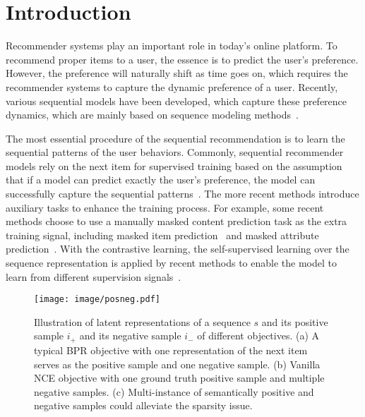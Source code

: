\documentclass[conference]{IEEEtran}
\begin{document}
\section{Introduction}
\label{sec:intro}
Recommender systems play an important role in today's online platform. To recommend proper items to a user, the essence is to predict the user's preference. However, the preference will naturally shift as time goes on, which requires the recommender systems to capture the dynamic preference of a user. Recently, various sequential models have been developed, which capture these preference dynamics, which are mainly based on sequence modeling methods~\cite{gru4rec,caser,sasrec,fdsa,bert4rec,s3rec,s2s,gru4recf,safm,fgnn,fgnnj,gag,posrec}. 

The most essential procedure of the sequential recommendation is to learn the sequential patterns of the user behaviors. Commonly, sequential recommender models rely on the next item for supervised training based on the assumption that if a model can predict exactly the user's preference, the model can successfully capture the sequential patterns~\cite{gru4rec,caser,sasrec}. The more recent methods introduce auxiliary tasks to enhance the training process. For example, some recent methods choose to use a manually masked content prediction task as the extra training signal, including masked item prediction~\cite{bert4rec} and masked attribute prediction~\cite{s3rec}. With the contrastive learning, the self-supervised learning over the sequence representation is applied by recent methods to enable the model to learn from different supervision signals~\cite{s3rec,s2s,xie2020contrastive,zhou2020contrastive}.

\begin{figure}
    \centering
    \texttt{[image: image/posneg.pdf]}
    \caption{Illustration of latent representations of a sequence $s$ and its positive sample $i_+$ and its negative sample $i_-$ of different objectives. (a) A typical BPR objective with one representation of the next item serves as the positive sample and one negative sample. (b) Vanilla NCE objective with one ground truth positive sample and multiple negative samples. (c) Multi-instance of semantically positive and negative samples could alleviate the sparsity issue.}
    \label{fig:posneg}
\end{figure}
\end{document}
